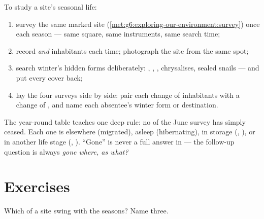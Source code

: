 \begin{method}\label{met:g6:life-through-seasons:yearsurvey}
To study a site's seasonal life:
\begin{enumerate}
  \item survey the same marked site
        (\cref{met:g6:exploring-our-environment:survey})
        once each season --- same square, same instruments,
        same search time;
  \item record  \emph{and} inhabitants each time;
        photograph the site from the same spot;
  \item search winter's hidden forms deliberately: ,
        , , chrysalises, sealed snails --- and put
        every cover back;
  \item lay the four surveys side by side: pair each change
        of inhabitants with a change of , and
        name each absentee's winter form or destination.
\end{enumerate}
\end{method}

\begin{remark}\label{rem:g6:life-through-seasons:vanish}
The year-round table teaches one deep rule: no  of
the June survey has simply ceased. Each one is elsewhere
(migrated), asleep (hibernating), in storage (, ),
or in another life stage (, ). ``Gone'' is
never a full answer in  --- the follow-up question
is always \emph{gone where, as what?}
\end{remark}

\section{Exercises}

\begin{exercise}[$\star$]\label{exo:g6:life-through-seasons:1}
Which  of a site swing with the seasons? Name
three.
\end{exercise}

